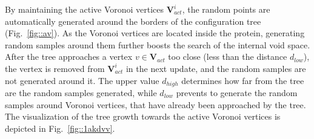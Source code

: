 \documentclass[usletter, 10pt, conference]{svjour3}      %
\def\VVA{\mathbf{V}_{act}}
\def\da{d_{high}}
\def\db{d_{low}}
\begin{document}
By maintaining the active Voronoi vertices $\VVA^i$, the random points are automatically generated around the borders of the configuration tree (Fig.~\ref{fig::av}).
As the Voronoi vertices are located inside the protein, generating random samples around them further boosts the search of the internal void space.
After the tree approaches a vertex $v \in \VVA$ too close (less than the distance $\db$), the vertex is removed from $\VVA^i$ in the next update, and the random samples are not generated around it.
The upper value $\da$ determines how far from the tree are the random samples generated, while $\db$ prevents to generate
the random samples around Voronoi vertices, that have already been approached by the tree.
The visualization of the tree growth towards the active Voronoi vertices is depicted in Fig.~\ref{fig::1akdvv}.
\end{document}
